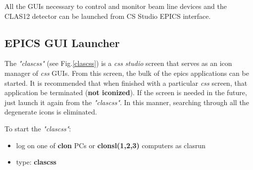 \documentclass[12pt]{article}
\begin{document}
All the GUIs necessary to control and monitor beam line devices and the CLAS12 detector can be launched from CS Studio EPICS interface. 

\subsection{EPICS GUI Launcher}
\indent

The \emph{"clascss"} (see Fig.\ref{clascss}) is a \emph{css studio} screen that serves as an icon manager of
\emph{css} GUIs. From this screen, the bulk of the epics applications can
be started. It is recommended that when finished with a particular \emph{css}
screen, that application be terminated (\textbf{not iconized}). If the screen
is needed in the future, just launch it again from the \emph{"clascss"}. In this
manner, searching through all the degenerate icons is eliminated. 

To start the \emph{"clascss"}:

\begin{itemize}
\item log on one of  \textbf{clon} PCs or \textbf{clonsl(1,2,3)} computers as clasrun
\item type: \textbf{clascss}
\end{itemize}
\end{document}
